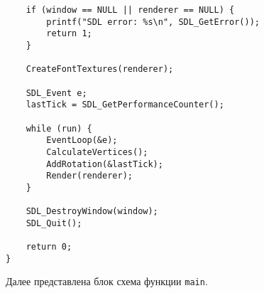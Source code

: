 \documentclass[14pt]{extarticle}
\begin{document}
{\begin{lstlisting}
    if (window == NULL || renderer == NULL) {
    	printf("SDL error: %s\n", SDL_GetError());
    	return 1;
    }

    CreateFontTextures(renderer);

    SDL_Event e;
    lastTick = SDL_GetPerformanceCounter();

    while (run) {
    	EventLoop(&e);
    	CalculateVertices();
    	AddRotation(&lastTick);
    	Render(renderer);
    }
    
    SDL_DestroyWindow(window);
    SDL_Quit();

	return 0;
} \end{lstlisting}
    \par

    \begin{spacing}{1.5}
        \noindent
        Далее представлена блок схема функции \verb|main|.
    \end{spacing}

}
\end{document}
